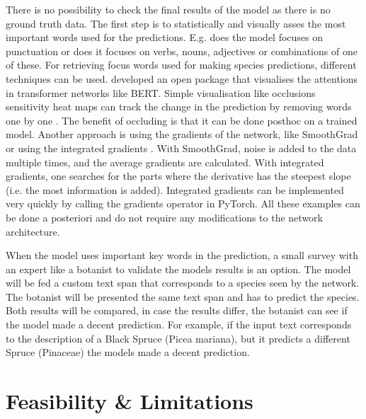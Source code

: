 \documentclass[a4paper, 12pt, oneside]{book} %
\begin{document}

There is no possibility to check the final results of the model as there is no ground truth data.
The first step is to statistically and visually asses the most important words used for the predictions. 
E.g. does the model focuses on punctuation or does it focuses on verbs, nouns, adjectives or combinations of one of these.
For retrieving focus words used for making species predictions, different techniques can be used.
\textcite{vig_multiscale_2019} developed an open package that visualises the attentions in transformer networks like BERT.
Simple visualisation like occlusions sensitivity heat maps can track the change in the prediction by removing words one by one \autocite{fleet_visualizing_2014}.
The benefit of occluding is that it can be done posthoc on a trained model.
Another approach is using the gradients of the network, like SmoothGrad \autocite{smilkov_smoothgrad_2017} or using the integrated gradients \autocite{sundararajan_axiomatic_2017}.
With SmoothGrad, noise is added to the data multiple times, and the average gradients are calculated.
With integrated gradients, one searches for the parts where the derivative has the steepest slope (i.e. the most information is added).
Integrated gradients can be implemented very quickly by calling the gradients operator in PyTorch.
All these examples can be done a posteriori and do not require any modifications to the network architecture.

When the model uses important key words in the prediction, a small survey with an expert like a botanist to validate the models results is an option.
The model will be fed a custom text span that corresponds to a species seen by the network.
The botanist will be presented the same text span and has to predict the species.
Both results will be compared, in case the results differ, the botanist can see if the model made a decent prediction.
For example, if the input text corresponds to the description of a Black Spruce (Picea mariana), but it predicts a different Spruce (Pinaceae) the models made a decent prediction. 

\section{Feasibility \& Limitations}
\end{document}
